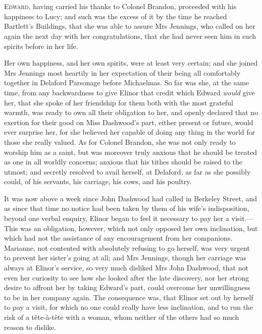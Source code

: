 \chapter[Chapter \thechapter]{}
\lettrine[lines=4,lraise=0.3]{E}{dward}, having carried his thanks to Colonel Brandon, proceeded with his happiness to Lucy; and such was the excess of it by the time he reached Bartlett’s Buildings, that she was able to assure Mrs Jennings, who called on her again the next day with her congratulations, that she had never seen him in such spirits before in her life.

Her own happiness, and her own spirits, were at least very certain; and she joined Mrs Jennings most heartily in her expectation of their being all comfortably together in Delaford Parsonage before Michaelmas. So far was she, at the same time, from any backwardness to give Elinor that credit which Edward \textit{would} give her, that she spoke of her friendship for them both with the most grateful warmth, was ready to own all their obligation to her, and openly declared that no exertion for their good on Miss Dashwood’s part, either present or future, would ever surprise her, for she believed her capable of doing any thing in the world for those she really valued. As for Colonel Brandon, she was not only ready to worship him as a saint, but was moreover truly anxious that he should be treated as one in all worldly concerns; anxious that his tithes should be raised to the utmost; and secretly resolved to avail herself, at Delaford, as far as she possibly could, of his servants, his carriage, his cows, and his poultry.

It was now above a week since John Dashwood had called in Berkeley Street, and as since that time no notice had been taken by them of his wife’s indisposition, beyond one verbal enquiry, Elinor began to feel it necessary to pay her a visit.—This was an obligation, however, which not only opposed her own inclination, but which had not the assistance of any encouragement from her companions. Marianne, not contented with absolutely refusing to go herself, was very urgent to prevent her sister’s going at all; and Mrs Jennings, though her carriage was always at Elinor’s service, so very much disliked Mrs John Dashwood, that not even her curiosity to see how she looked after the late discovery, nor her strong desire to affront her by taking Edward’s part, could overcome her unwillingness to be in her company again. The consequence was, that Elinor set out by herself to pay a visit, for which no one could really have less inclination, and to run the risk of a tête-à-tête with a woman, whom neither of the others had so much reason to dislike.

